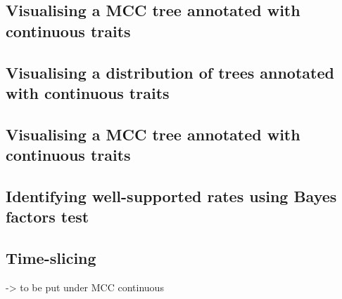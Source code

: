 \documentclass[english]{paper}
\begin{document}
\subsection{Visualising a MCC tree annotated with continuous traits}
\subsection{Visualising a distribution of trees annotated with continuous traits}
\subsection{Visualising a MCC tree annotated with continuous traits}
\label{JSONmerge}
\subsection{Identifying well-supported rates using Bayes factors test}

% 
%
\subsection{Time-slicing}
-> to be put under MCC continuous 

% 
% 
\end{document}
